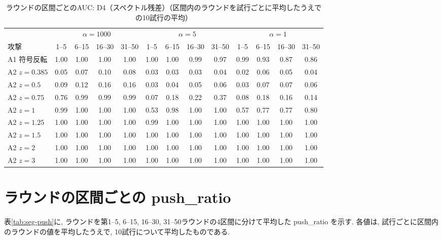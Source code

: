 \documentclass[a4j, twocolumn, dvipdfmx]{jsarticle}
\newcommand{\PushRatio}{\textrm{push\_ratio}}
\begin{document}
\begin{table}[H]
\centering
\caption{ラウンドの区間ごとのAUC: D4（スペクトル残差）（区間内のラウンドを試行ごとに平均したうえでの10試行の平均）}
\label{tab:seg-d4}
\footnotesize
\tabcolsep=3.2pt
\begin{tabular}{@{}l@{\hspace{5pt}}cccc@{\hspace{8pt}}cccc@{\hspace{8pt}}cccc@{}}
\toprule
 & \multicolumn{4}{c}{$\alpha=1000$} & \multicolumn{4}{c}{$\alpha=5$} & \multicolumn{4}{c}{$\alpha=1$} \\
\cmidrule(lr){2-5}\cmidrule(lr){6-9}\cmidrule(l){10-13}
攻撃 & 1--5 & 6--15 & 16--30 & 31--50 & 1--5 & 6--15 & 16--30 & 31--50 & 1--5 & 6--15 & 16--30 & 31--50 \\
\midrule
A1 符号反転 & 1.00 & 1.00 & 1.00 & 1.00 & 1.00 & 1.00 & 0.99 & 0.97 & 0.99 & 0.93 & 0.87 & 0.86 \\
\midrule
A2 $z{=}0.385$ & 0.05 & 0.07 & 0.10 & 0.08 & 0.03 & 0.03 & 0.03 & 0.04 & 0.02 & 0.06 & 0.05 & 0.04 \\
A2 $z{=}0.5$ & 0.09 & 0.12 & 0.16 & 0.16 & 0.03 & 0.04 & 0.05 & 0.06 & 0.03 & 0.07 & 0.07 & 0.06 \\
A2 $z{=}0.75$ & 0.76 & 0.99 & 0.99 & 0.99 & 0.07 & 0.18 & 0.22 & 0.37 & 0.08 & 0.18 & 0.16 & 0.14 \\
A2 $z{=}1$ & 0.99 & 1.00 & 1.00 & 1.00 & 0.53 & 0.98 & 1.00 & 1.00 & 0.57 & 0.77 & 0.77 & 0.80 \\
A2 $z{=}1.25$ & 1.00 & 1.00 & 1.00 & 1.00 & 0.99 & 1.00 & 1.00 & 1.00 & 1.00 & 1.00 & 1.00 & 1.00 \\
A2 $z{=}1.5$ & 1.00 & 1.00 & 1.00 & 1.00 & 1.00 & 1.00 & 1.00 & 1.00 & 1.00 & 1.00 & 1.00 & 1.00 \\
A2 $z{=}2$ & 1.00 & 1.00 & 1.00 & 1.00 & 1.00 & 1.00 & 1.00 & 1.00 & 1.00 & 1.00 & 1.00 & 1.00 \\
A2 $z{=}3$ & 1.00 & 1.00 & 1.00 & 1.00 & 1.00 & 1.00 & 1.00 & 1.00 & 1.00 & 1.00 & 1.00 & 1.00 \\
\bottomrule
\end{tabular}
\end{table}

\section{ラウンドの区間ごとの \PushRatio{}}
\label{sec:appendix-pushratio}

表\ref{tab:seg-push}に, ラウンドを第1--5, 6--15, 16--30, 31--50ラウンドの4区間に分けて平均した \PushRatio{} を示す. 各値は, 試行ごとに区間内のラウンドの値を平均したうえで, 10試行について平均したものである.
\end{document}

